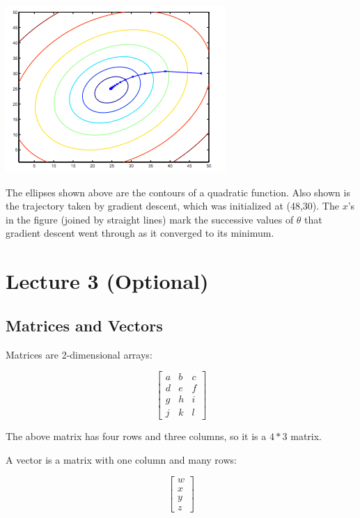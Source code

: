 \documentclass[UTF8]{article}
\begin{document}
\includegraphics[width = \textwidth]{NotePics/2_3_2_2.png}

The ellipses shown above are the contours of a quadratic function. Also shown is the trajectory taken by gradient descent, which was initialized at (48,30). The $x$'s in the figure (joined by straight lines) mark the successive values of $\theta$ that gradient descent went through as it converged to its minimum.

\newpage

\section{Lecture 3 (Optional)}

\subsection{Matrices and Vectors}

Matrices are 2-dimensional arrays:

\[ \begin{bmatrix} a&b&c\\d&e&f\\g&h&i\\j&k&l \end{bmatrix} \]

The above matrix has four rows and three columns, so it is a $4 * 3$ matrix.

A vector is a matrix with one column and many rows:

\[ \begin{bmatrix} w\\x\\y\\z \end{bmatrix} \]
\end{document}

